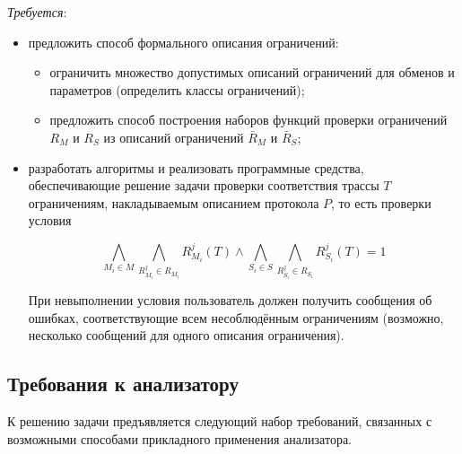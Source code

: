 \textit{Требуется}: 

\begin{itemize}
 \item предложить способ формального описания ограничений:
 \begin{itemize}
  \item ограничить множество допустимых описаний ограничений для обменов и 
параметров (определить классы ограничений);
  \item предложить способ построения наборов функций проверки ограничений 
$R_M$ и $R_S$ из описаний ограничений $\bar{R}_M$ и $\bar{R}_S$;
 \end{itemize}
 \item разработать алгоритмы и реализовать программные средства, 
обеспечивающие решение задачи проверки соответствия трассы $T$ ограничениям, 
накладываемым описанием протокола $P$, то есть проверки условия

$$\bigwedge\limits_{M_i \in M} \bigwedge\limits_{R_{M_i}^j \in R_{M_i}} 
R_{M_i}^j(T) \wedge \bigwedge\limits_{S_i \in S} \bigwedge\limits_{R_{S_i}^j 
\in R_{S_i}} R_{S_i}^j(T) = 1$$

При невыполнении условия пользователь должен получить сообщения об ошибках, 
соответствующие всем несоблюдённым ограничениям (возможно, несколько сообщений 
для одного описания ограничения).
\end{itemize}


\subsection{Требования к анализатору}

К решению задачи предъявляется следующий набор требований, связанных с 
возможными способами прикладного применения анализатора.

